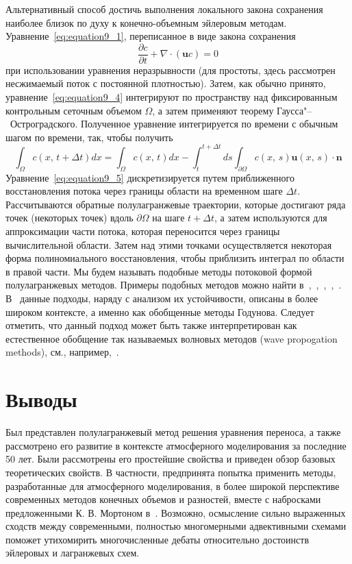 Альтернативный способ достичь выполнения локального закона сохранения наиболее близок по духу к конечно-объемным эйлеровым методам. Уравнение~\eqref{eq:equation9_1}, переписанное в виде закона сохранения
%
\begin{equation}
\label{eq:equation9_4}
\frac{\partial c}{\partial t} + \nabla\cdot(\mathbf{u}c) = 0
\end{equation}
%
при использовании уравнения неразрывности (для простоты, здесь рассмотрен несжимаемый поток с постоянной плотностью). Затем, как обычно принято, уравнение~\eqref{eq:equation9_4} интегрируют по пространству над фиксированным контрольным сеточным объемом $\Omega$, а затем применяют теорему Гаусса"--~Остроградского. Полученное уравнение интегрируется по времени с обычным шагом по времени, так, чтобы получить
%
\begin{equation}
\label{eq:equation9_5}
\int_{\Omega}c(x,\,t +\Delta t)dx=\int_{\Omega}c(x,\,t)dx-\int_{t}^{t+\Delta t}ds\int_{\partial\Omega}c(x,\,s)\mathbf{u}(x,\,s)\cdot\mathbf{n}
\end{equation}
%
Уравнение~\eqref{eq:equation9_5} дискретизируется путем приближенного восстановления потока через границы области на временном шаге $\Delta t$. Рассчитываются обратные полулагранжевые траектории, которые достигают ряда точек (некоторых точек) вдоль $\partial \Omega$ на шаге $t+\Delta t$, а затем используются для аппроксимации части потока, которая переносится через границы вычислительной области. Затем над этими точками осуществляется некоторая форма полиномиального восстановления, чтобы приблизить интеграл по области в правой части. Мы будем называть подобные методы потоковой формой полулагранжевых методов. Примеры подобных методов можно найти в~\cite{A17},~\cite{A18},~\cite{A19},~\cite{A31},~\cite{A33}. В~\cite{A43} данные подходы, наряду с анализом их устойчивости, описаны в более широком контексте, а именно как обобщенные методы Годунова. Следует отметить, что данный подход может быть также интерпретирован как естественное обобщение так называемых волновых методов (wave propogation methods), см., например,~\cite{A32}.
\newpage
\chapter{Выводы} \label{chapt_10}
Был представлен полулагранжевый метод решения уравнения переноса, а также рассмотрено его развитие в контексте атмосферного моделирования за последние 50 лет. Были рассмотрены его простейшие свойства и приведен обзор базовых теоретических свойств. В частности, предпринята попытка применить методы, разработанные для атмосферного моделирования, в более широкой перспективе современных методов конечных объемов и разностей, вместе с набросками предложенными К. В. Мортоном в~\cite{A43}. Возможно, осмысление сильно выраженных сходств между современными, полностью многомерными адвективными схемами поможет утихомирить многочисленные дебаты относительно достоинств эйлеровых и лагранжевых схем.
